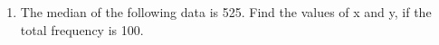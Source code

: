 \renewcommand{\theequation}{\theenumi}
\begin{enumerate}[label=\arabic*.,ref=\thesubsection.\theenumi]
\item The median of the following data is 525. Find the values of x and y, if the
total frequency is 100.
\begin{table}[!ht]
	\centering
	
\end{table}
\end{enumerate}